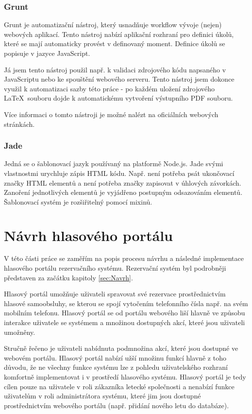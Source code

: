 \documentclass[ing,male,java,dept460,twoside]{diploma}						%
\begin{document}
\subsubsection{Grunt}
Grunt je automatizační nástroj, který usnadňuje workflow vývoje (nejen) webových aplikací. Tento nástroj nabízí aplikační rozhraní pro definici úkolů, které se mají automaticky provést v definovaný moment. Definice úkolů se popisuje v jazyce JavaScript.

Já jsem tento nástroj použil např. k validaci zdrojového kódu napsaného v JavaScriptu nebo ke spouštění webového serveru. Tento nástroj jsem dokonce využil k automatizaci sazby této práce - po každém uložení zdrojového \LaTeX\ souboru dojde k automatickému vytvoření výstupního PDF souboru.

Více informaci o tomto nástroji je možné nalézt na oficiálních webových stránkách\cite{grunt}.

\subsubsection{Jade}
Jedná se o šablonovací jazyk používaný na platformě Node.js. Jade svými vlastnostmi urychluje zápis HTML kódu. Např. není potřeba psát ukončovací značky HTML elementů a není potřeba značky zapisovat v úhlových závorkách. Zanoření jednotlivých elementů je vyjádřeno postupným odsazováním elementů. Šablonovací systém je rozšiřitelný pomocí mixinů.

\section{Návrh hlasového portálu}
\label{sec:Navrh_hlasoveho_portalu}
V této části práce se zaměřím na popis procesu návrhu a následné implementace hlasového portálu rezervačního systému. Rezervační systém byl podrobněji představen za začátku kapitoly \ref{sec:Navrh}.

Hlasový portál umožňuje uživateli spravovat své rezervace prostřednictvím hlasové samoobsluhy, se kterou se spojí vytočením telefonního čísla např. na svém mobilním telefonu. Hlasový portál se od portálu webového liší hlavně ve způsobu interakce uživatele se systémem a množinou dostupných akcí, které jsou uživateli umožněny.

Stručně řečeno je uživateli nabídnuta podmnožina akcí, které jsou dostupné ve webovém portálu. Hlasový portál nabízí užší množinu funkcí hlavně z toho důvodu, že ne všechny funkce systému lze z pohledu uživatelského rozhraní komfortně implementovat i v prostředí hlasového systému. Hlasový portál je tedy cílen pouze na uživatele v roli zákazníka letecké společnosti a nenabízí funkce uživatelům v roli administrátora systému, které jim jsou dostupné prostřednictvím webového portálu (např. přidání nového letu do databáze).
\end{document}
